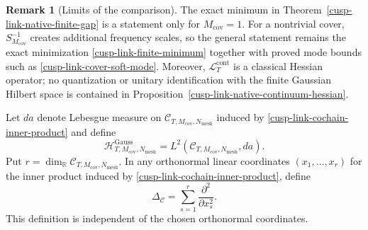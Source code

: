 \documentclass[11pt]{article}
\theoremstyle{definition}
\newtheorem{remark}[theorem]{Remark}
\numberwithin{equation}{section}
\begin{document}
\begin{remark}[Limits of the comparison]
\label{cusp-link-native-comparison-scope}
The exact minimum in Theorem~\ref{cusp-link-native-finite-gap} is a statement
only for \(M_{\mathrm{cov}}=1\).  For a nontrivial cover,
\(S_{M_{\mathrm{cov}}}^{-1}\) creates additional frequency scales, so the
general statement remains the exact minimization
\eqref{cusp-link-finite-minimum} together with proved mode bounds such as
\eqref{cusp-link-cover-soft-mode}.  Moreover,
\(\mathcal L_T^{\mathrm{cont}}\) is a classical Hessian operator; no
quantization or unitary identification with the finite Gaussian Hilbert space
is contained in Proposition~\ref{cusp-link-native-continuum-hessian}.
\end{remark}

Let \(da\) denote Lebesgue measure on
\(\mathscr C_{T,M_{\mathrm{cov}},N_{\mathrm{mesh}}}\) induced by
\eqref{cusp-link-cochain-inner-product} and define
\begin{equation}
 \mathcal H^{\mathrm{Gauss}}_{T,M_{\mathrm{cov}},N_{\mathrm{mesh}}}
 =L^2(\mathscr C_{T,M_{\mathrm{cov}},N_{\mathrm{mesh}}},da).
 \label{cusp-link-gaussian-hilbert-space}
\end{equation}
Put
\(r=\dim_{\mathbb R}\mathscr C_{T,M_{\mathrm{cov}},N_{\mathrm{mesh}}}\).
In any orthonormal linear coordinates \((x_1,\ldots,x_r)\) for the inner
product induced by \eqref{cusp-link-cochain-inner-product}, define
\begin{equation}
 \Delta_{\mathscr C}=\sum_{s=1}^r\frac{\partial^2}{\partial x_s^2}.
 \label{cusp-link-coulomb-laplacian}
\end{equation}
This definition is independent of the chosen orthonormal coordinates.
\end{document}
